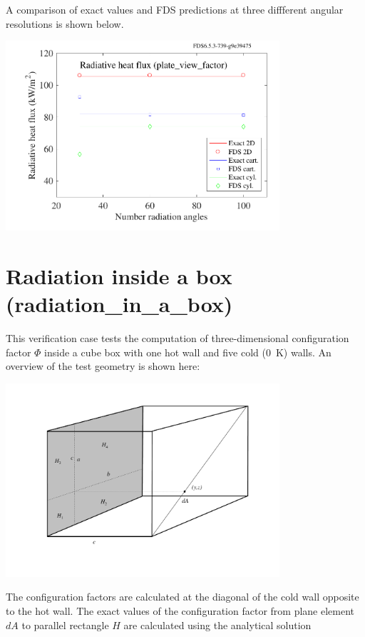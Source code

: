 \documentclass[11pt]{book}
\begin{document}
A comparison of exact values and FDS predictions at three diffferent angular resolutions is shown below.
\begin{center}
\includegraphics[width=4.0in]{SCRIPT_FIGURES/plate_view_factor.pdf}
\end{center}



\clearpage


\section{Radiation inside a box (\texorpdfstring{{\bf radiation\_in\_a\_box}}{radiation\_in\_a\_box}) }
\label{radiation_in_a_box}

This verification case tests the computation of three-dimensional configuration factor $\Phi$ inside a cube box with one hot wall and five cold (0~K)
walls. An overview of the test geometry is shown here:
\begin{center}
\includegraphics[width=4.0in]{FIGURES/box.pdf}
\end{center}
The configuration factors are calculated at the diagonal of the cold wall opposite to the hot wall. The exact values of the configuration factor from
plane element $dA$ to parallel rectangle $H$ are calculated using the analytical solution~\cite{Siegel:1}
\end{document}
